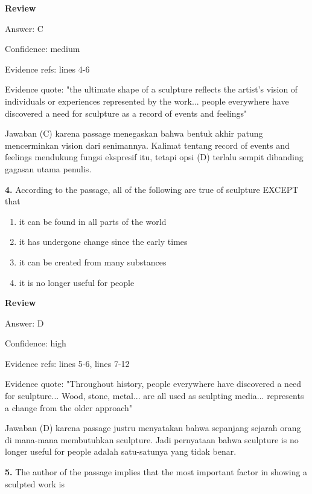 \documentclass[12pt]{article}
\begin{document}
\setlength{\parskip}{0pt}
\setlength{\parindent}{0pt}
\textbf{Review}\par
Answer: C\par
Confidence: medium\par
Evidence refs: lines 4-6\par
Evidence quote: "the ultimate shape of a sculpture reflects the artist's vision of individuals or experiences represented by the work... people everywhere have discovered a need for sculpture as a record of events and feelings"\par
Jawaban (C) karena passage menegaskan bahwa bentuk akhir patung mencerminkan vision dari senimannya. Kalimat tentang record of events and feelings mendukung fungsi ekspresif itu, tetapi opsi (D) terlalu sempit dibanding gagasan utama penulis.\par
\endgroup
\par
\vspace{0.25\baselineskip}
\noindent\textbf{4.} According to the passage, all of the following are true of sculpture EXCEPT that
\begin{enumerate}[label=(\Alph*),leftmargin=*,itemsep=0.2em]
\item it can be found in all parts of the world
\item it has undergone change since the early times
\item it can be created from many substances
\item it is no longer useful for people
\end{enumerate}
\par
\begingroup
\setlength{\parskip}{0pt}
\setlength{\parindent}{0pt}
\textbf{Review}\par
Answer: D\par
Confidence: high\par
Evidence refs: lines 5-6, lines 7-12\par
Evidence quote: "Throughout history, people everywhere have discovered a need for sculpture... Wood, stone, metal... are all used as sculpting media... represents a change from the older approach"\par
Jawaban (D) karena passage justru menyatakan bahwa sepanjang sejarah orang di mana-mana membutuhkan sculpture. Jadi pernyataan bahwa sculpture is no longer useful for people adalah satu-satunya yang tidak benar.\par
\endgroup
\par
\vspace{0.25\baselineskip}
\noindent\textbf{5.} The author of the passage implies that the most important factor in showing a sculpted work is
\end{document}

